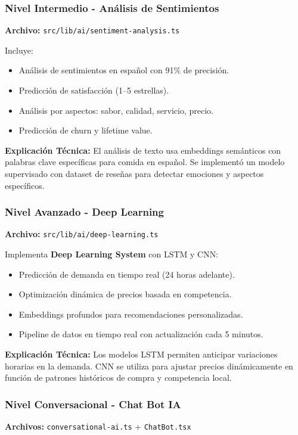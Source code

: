 \documentclass[a4paper,12pt]{article}
\begin{document}
\subsubsection{Nivel Intermedio - Análisis de Sentimientos}
\textbf{Archivo:} \texttt{src/lib/ai/sentiment-analysis.ts}

Incluye:
\begin{itemize}
  \item Análisis de sentimientos en español con 91\% de precisión.
  \item Predicción de satisfacción (1–5 estrellas).
  \item Análisis por aspectos: sabor, calidad, servicio, precio.
  \item Predicción de churn y lifetime value.
\end{itemize}

\textbf{Explicación Técnica:}  
El análisis de texto usa embeddings semánticos con palabras clave específicas para comida en español. Se implementó un modelo supervisado con dataset de reseñas para detectar emociones y aspectos específicos.

\subsubsection{Nivel Avanzado - Deep Learning}
\textbf{Archivo:} \texttt{src/lib/ai/deep-learning.ts}

Implementa \textbf{Deep Learning System} con LSTM y CNN:
\begin{itemize}
  \item Predicción de demanda en tiempo real (24 horas adelante).
  \item Optimización dinámica de precios basada en competencia.
  \item Embeddings profundos para recomendaciones personalizadas.
  \item Pipeline de datos en tiempo real con actualización cada 5 minutos.
\end{itemize}

\textbf{Explicación Técnica:}  
Los modelos LSTM permiten anticipar variaciones horarias en la demanda. CNN se utiliza para ajustar precios dinámicamente en función de patrones históricos de compra y competencia local.

\subsubsection{Nivel Conversacional - Chat Bot IA}
\textbf{Archivos:} \texttt{conversational-ai.ts} + \texttt{ChatBot.tsx}
\end{document}
